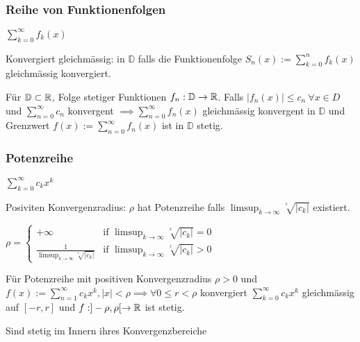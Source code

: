 \subsubsection{Reihe von Funktionenfolgen}
$\sum_{k=0}^{\infty} f_k(x)$
\begin{compactdesc}
    \item[Konvergiert gleichmässig:] in $\mathbb{D}$ falls die Funktionenfolge $S_n(x) := \sum_{k=0}^{n} f_k(x)$ gleichmässig konvergiert.
    \item Für $\mathbb{D} \subset \mathbb{R}$, Folge stetiger Funktionen $f_n:\mathbb{D} \to \mathbb{R}$. Falls $\left| f_n(x) \right| \le c_n \ \forall x \in D$ und $\sum_{n=0}^{\infty} c_n$ konvergent $\implies \sum_{n=0}^{\infty} f_n(x)$ gleichmässig konvergent in $\mathbb{D}$ und Grenzwert $f(x) := \sum_{n=0}^{\infty} f_n(x)$ ist in $\mathbb{D}$ stetig.
\end{compactdesc}

\subsubsection{Potenzreihe}
\begin{compactitem}
    \item $\sum_{k=0}^{\infty} c_kx^k$
\end{compactitem}
\begin{compactdesc}
\item[Posiviten Konvergenzradius:] $\rho$ hat Potenzreihe falls $\limsup_{k \to \infty} \sqrt[^k]{\left| c_k \right| }$ existiert.
    \begin{compactitem}
        \item $\rho = \begin{cases}
            + \infty & \text{if } \limsup_{k \to \infty} \sqrt[^k]{\left| c_k \right| } = 0\\
            \frac{1}{\limsup_{k \to \infty}\sqrt[^k]{\left| c_k \right| }} & \text{if } \limsup_{k \to \infty} \sqrt[^k]{\left| c_k \right| } > 0
        \end{cases}$
    \end{compactitem}
\end{compactdesc}
\begin{compactitem}
    \item Für Potenzreihe mit positiven Konvergenzradius $\rho > 0$ und $f(x):= \sum_{n=1}^{\infty} c_kx^k, |x| < \rho \implies \forall 0 \le r < \rho$ konvergiert $\sum_{k=0}^{\infty} c_kx^k$ gleichmässig auf $[-r, r]$ und $f:]-\rho, \rho[ \to \mathbb{R}$ ist stetig.
    \item Sind stetig im Innern ihres Konvergenzbereiche
\end{compactitem}

